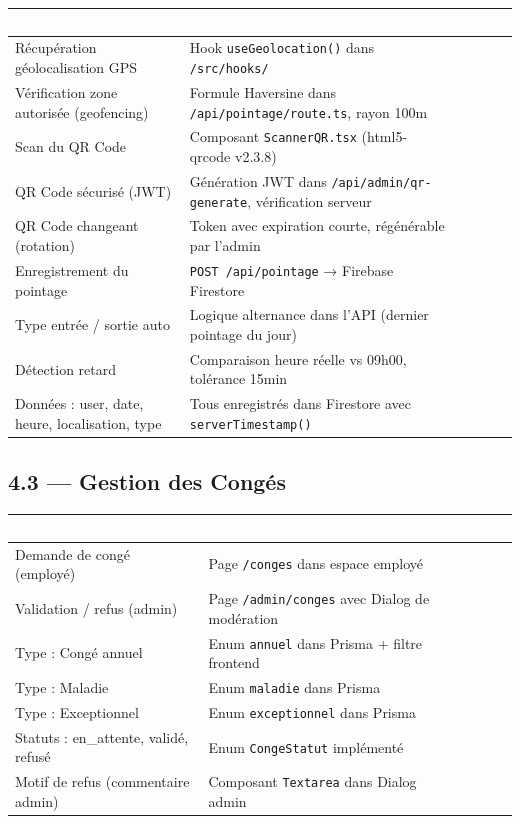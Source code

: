 \documentclass[12pt,a4paper]{article}
\newcommand{\cmark}{\textcolor{vert}{\ding{51}}}
\begin{document}
\begin{longtable}{p{5.5cm} p{5.5cm} c}
\toprule
\rowcolor{headerblue}
\textcolor{white}{\textbf{Exigence}} & \textcolor{white}{\textbf{Implémentation}} & \textcolor{white}{\textbf{Statut}} \\
\midrule
\endhead
Récupération géolocalisation GPS & Hook \texttt{useGeolocation()} dans \texttt{/src/hooks/} & \cmark \\
\midrule
Vérification zone autorisée (geofencing) & Formule Haversine dans \texttt{/api/pointage/route.ts}, rayon 100m & \cmark \\
\midrule
Scan du QR Code & Composant \texttt{ScannerQR.tsx} (html5-qrcode v2.3.8) & \cmark \\
\midrule
QR Code sécurisé (JWT) & Génération JWT dans \texttt{/api/admin/qr-generate}, vérification serveur & \cmark \\
\midrule
QR Code changeant (rotation) & Token avec expiration courte, régénérable par l'admin & \cmark \\
\midrule
Enregistrement du pointage & \texttt{POST /api/pointage} → Firebase Firestore & \cmark \\
\midrule
Type entrée / sortie auto & Logique alternance dans l'API (dernier pointage du jour) & \cmark \\
\midrule
Détection retard & Comparaison heure réelle vs 09h00, tolérance 15min & \cmark \\
\midrule
Données : user, date, heure, localisation, type & Tous enregistrés dans Firestore avec \texttt{serverTimestamp()} & \cmark \\
\bottomrule
\end{longtable}

\subsection{4.3 — Gestion des Congés}

\begin{longtable}{p{5.5cm} p{5.5cm} c}
\toprule
\rowcolor{headerblue}
\textcolor{white}{\textbf{Exigence}} & \textcolor{white}{\textbf{Implémentation}} & \textcolor{white}{\textbf{Statut}} \\
\midrule
\endhead
Demande de congé (employé) & Page \texttt{/conges} dans espace employé & \cmark \\
\midrule
Validation / refus (admin) & Page \texttt{/admin/conges} avec Dialog de modération & \cmark \\
\midrule
Type : Congé annuel & Enum \texttt{annuel} dans Prisma + filtre frontend & \cmark \\
\midrule
Type : Maladie & Enum \texttt{maladie} dans Prisma & \cmark \\
\midrule
Type : Exceptionnel & Enum \texttt{exceptionnel} dans Prisma & \cmark \\
\midrule
Statuts : en\_attente, validé, refusé & Enum \texttt{CongeStatut} implémenté & \cmark \\
\midrule
Motif de refus (commentaire admin) & Composant \texttt{Textarea} dans Dialog admin & \cmark \\
\bottomrule
\end{longtable}
\end{document}
